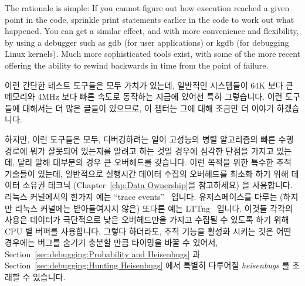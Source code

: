 The rationale is simple: If you cannot figure out how execution reached
a given point in the code, sprinkle print statements earlier in the
code to work out what happened.
You can get a similar effect, and with more convenience and flexibility,
by using a debugger such as gdb (for user applications) or kgdb
(for debugging Linux kernels).
Much more sophisticated tools exist, with some of the more recent
offering the ability to rewind backwards in time from the point
of failure.
\fi

이런 간단한 테스트 도구들은 모두 가치가 있는데, 일반적인 시스템들이 64K 보다 큰
메모리와 4MHz 보다 빠른 속도로 동작하는 지금에 있어선 특히 그렇습니다.
이런 도구들에 대해서는 더 많은 글들이 있으므로, 이 챕터는 그에 대해 조금만 더
이야기 하겠습니다.

하지만, 이런 도구들은 모두, 디버깅하려는 일이 고성능의 병렬 알고리즘의 빠른
수행경로에 뭐가 잘못되어 있는지를 알려고 하는 것일 경우에 심각한 단점을 가지고
있는데, 달리 말해 대부분의 경우 큰 오버헤드를 갖습니다.
이런 목적을 위한 특수한 추적 기술들이 있는데, 일반적으로 실행시간 데이터 수집의
오버헤드를 최소화 하기 위해 데이터 소유권 테크닉
(Chapter~\ref{chp:Data Ownership}을 참고하세요) 을 사용합니다.
리눅스 커널에서의 한가지 예는
``trace events''~\cite{StevenRostedt2010perfTraceEventP1,StevenRostedt2010perfTraceEventP2,StevenRostedt2010perfTraceEventP3,StevenRostedt2010perfHP+DeathlyMacros}
입니다.
유저스페이스를 다루는 (하지만 리눅스 커널에는 받아들여지지 않은) 또다른 예는
LTTng~\cite{MathieuDesnoyers2009LFCollabSummit} 입니다.
이것들 각각의 사용은 데이터가 극단적으로 낮은 오버헤드만을 가지고 수집될 수
있도록 하기 위해 CPU 별 버퍼를 사용합니다.
그렇다 하더라도, 추적 기능을 활성화 시키는 것은 어떤 경우에는 버그를 숨기기
충분할 만큼 타이밍을 바꿀 수 있어서,
Section~\ref{sec:debugging:Probability and Heisenbugs} 과
Section~\ref{sec:debugging:Hunting Heisenbugs} 에서 특별히 다루어질
\emph{heisenbugs} 를 초래할 수 있습니다.
\iffalse

